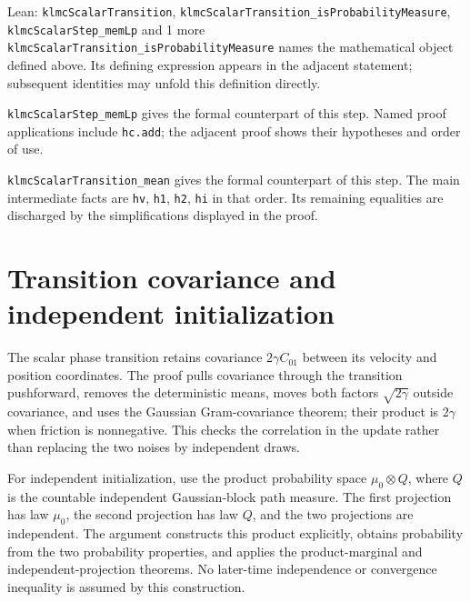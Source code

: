 \documentclass[11pt,a4paper]{article}
\begin{document}
\begin{leanbox}{Lean: \texttt{klmcScalarTransition}, \texttt{klmcScalarTransition\_\allowbreak{}isProbabilityMeasure}, \texttt{klmcScalarStep\_\allowbreak{}memLp} and 1 more}
\texttt{klmc\allowbreak{}Scalar\allowbreak{}Transition\_\allowbreak{}is\allowbreak{}Probability\allowbreak{}Measure} names the mathematical object defined above. Its defining expression appears in the adjacent statement; subsequent identities may unfold this definition directly.




\texttt{klmc\allowbreak{}Scalar\allowbreak{}Step\_\allowbreak{}mem\allowbreak{}Lp} gives the formal counterpart of this step. Named proof applications include \texttt{hc.\allowbreak{}add}; the adjacent proof shows their hypotheses and order of use.




\texttt{klmc\allowbreak{}Scalar\allowbreak{}Transition\_\allowbreak{}mean} gives the formal counterpart of this step. The main intermediate facts are \texttt{hv}, \texttt{h1}, \texttt{h2}, \texttt{hi} in that order. Its remaining equalities are discharged by the simplifications displayed in the proof.
\end{leanbox}

\section{\texorpdfstring{Transition covariance and independent initialization}{Transition covariance and independent initialization}}


The scalar phase transition retains covariance \(2\gamma C_{01}\) between its velocity and position coordinates. The proof pulls covariance through the transition pushforward, removes the deterministic means, moves both factors \(\sqrt{2\gamma}\) outside covariance, and uses the Gaussian Gram-covariance theorem; their product is \(2\gamma\) when friction is nonnegative. This checks the correlation in the update rather than replacing the two noises by independent draws.



For independent initialization, use the product probability space \(\mu_0\otimes Q\), where \(Q\) is the countable independent Gaussian-block path measure. The first projection has law \(\mu_0\), the second projection has law \(Q\), and the two projections are independent. The argument constructs this product explicitly, obtains probability from the two probability properties, and applies the product-marginal and independent-projection theorems. No later-time independence or convergence inequality is assumed by this construction.
\end{document}
